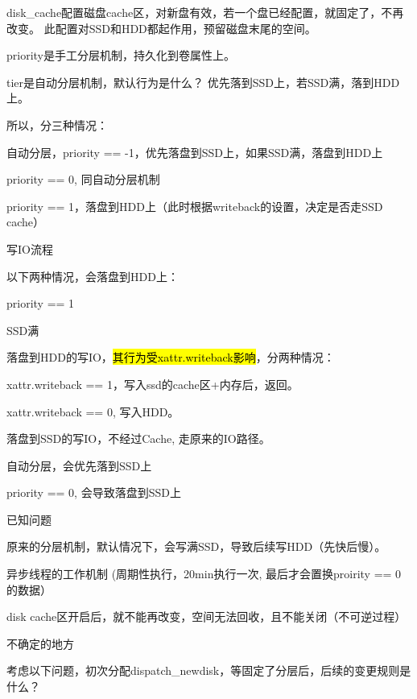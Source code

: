 disk\_cache配置磁盘cache区，对新盘有效，若一个盘已经配置，就固定了，不再改变。
此配置对SSD和HDD都起作用，预留磁盘末尾的空间。

priority是手工分层机制，持久化到卷属性上。

tier是自动分层机制，默认行为是什么？ 优先落到SSD上，若SSD满，落到HDD上。

所以，分三种情况：
\begin{compactenum}
\item 自动分层，priority == -1，优先落盘到SSD上，如果SSD满，落盘到HDD上
\item priority == 0, 同自动分层机制
\item priority == 1，落盘到HDD上（此时根据writeback的设置，决定是否走SSD cache）
\end{compactenum}

写IO流程

以下两种情况，会落盘到HDD上：
\begin{compactenum}
\item priority == 1
\item SSD满
\end{compactenum}

落盘到HDD的写IO，\hl{其行为受xattr.writeback影响}，分两种情况：
\begin{compactenum}
\item xattr.writeback == 1，写入ssd的cache区+内存后，返回。
\item xattr.writeback == 0, 写入HDD。
\end{compactenum}

落盘到SSD的写IO，不经过Cache, 走原来的IO路径。
\begin{compactenum}
\item 自动分层，会优先落到SSD上
\item priority == 0, 会导致落盘到SSD上
\end{compactenum}

已知问题

\begin{compactenum}
\item 原来的分层机制，默认情况下，会写满SSD，导致后续写HDD（先快后慢）。
\item 异步线程的工作机制 (周期性执行，20min执行一次, 最后才会置换proirity == 0的数据）
\item disk cache区开启后，就不能再改变，空间无法回收，且不能关闭（不可逆过程）
\end{compactenum}

不确定的地方

考虑以下问题，初次分配dispatch\_newdisk，等固定了分层后，后续的变更规则是什么？

